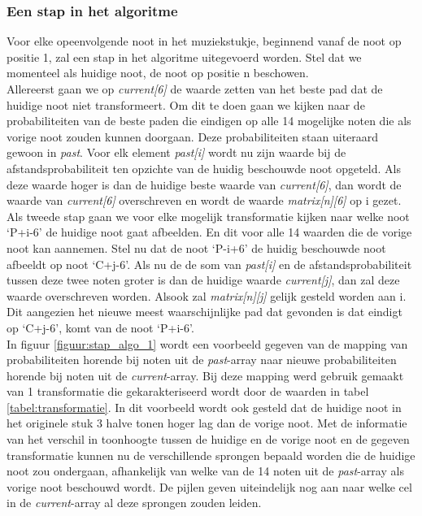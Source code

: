 \subsubsection{Een stap in het algoritme}
Voor elke opeenvolgende noot in het muziekstukje, beginnend vanaf de noot op positie 1, zal een stap in het algoritme uitegevoerd worden. Stel dat we momenteel als huidige noot, de noot op positie n beschowen.\\ 
Allereerst gaan we op \textit{current[6]} de waarde zetten van het beste pad dat de huidige noot niet transformeert. Om dit te doen gaan we kijken naar de probabiliteiten van de beste paden die eindigen op alle 14 mogelijke noten die als vorige noot zouden kunnen doorgaan. Deze probabiliteiten staan uiteraard gewoon in \textit{past}. Voor elk element \textit{past[i]} wordt nu zijn waarde bij de afstandsprobabiliteit ten opzichte van de huidig beschouwde noot opgeteld. Als deze waarde hoger is dan de huidige beste waarde van \textit{current[6]}, dan wordt de waarde van \textit{current[6]} overschreven en wordt de waarde \textit{matrix[n][6]} op i gezet.\\
Als tweede stap gaan we voor elke mogelijk transformatie kijken naar welke noot `P+i-6' de huidige noot gaat afbeelden. En dit voor alle 14 waarden die de vorige noot kan aannemen. Stel nu dat de noot `P-i+6' de huidig beschouwde noot afbeeldt op noot `C+j-6'. Als nu de de som van \textit{past[i]} en de afstandsprobabiliteit tussen deze twee noten groter is dan de huidige waarde \textit{current[j]}, dan zal deze waarde overschreven worden. Alsook zal \textit{matrix[n][j]} gelijk gesteld worden aan i. Dit aangezien het nieuwe meest waarschijnlijke pad dat gevonden is dat eindigt op `C+j-6', komt van de noot `P+i-6'.\\
In figuur \ref{figuur:stap_algo_1} wordt een voorbeeld gegeven van de mapping van probabiliteiten horende bij noten uit de \textit{past}-array naar nieuwe probabiliteiten horende bij noten uit de \textit{current}-array. Bij deze mapping werd gebruik gemaakt van 1 transformatie die gekarakteriseerd wordt door de waarden in tabel \ref{tabel:transformatie}. In dit voorbeeld wordt ook gesteld dat de huidige noot in het originele stuk 3 halve tonen hoger lag dan de vorige noot. Met de informatie van het verschil in toonhoogte tussen de huidige en de vorige noot en de gegeven transformatie kunnen nu de verschillende sprongen bepaald worden die de huidige noot zou ondergaan, afhankelijk van welke van de 14 noten uit de \textit{past}-array als vorige noot beschouwd wordt. De pijlen geven uiteindelijk nog aan naar welke cel in de \textit{current}-array al deze sprongen zouden leiden.\\ 
